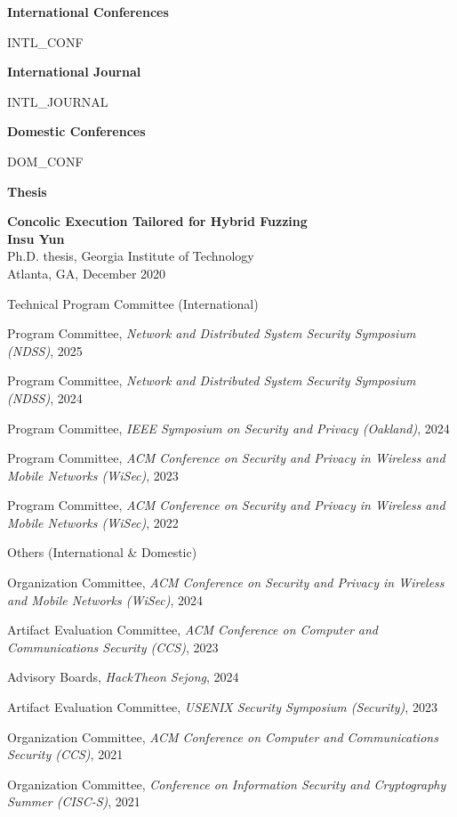 \documentclass[11pt,letterpaper]{article}
\begin{document}
%
%


\textbf{International Conferences }
\begin{etaremune}
  {{ INTL_CONF }}
\end{etaremune}

\textbf{International Journal}
\begin{etaremune}
  {{ INTL_JOURNAL }}
\end{etaremune}

\textbf{Domestic Conferences}
\begin{etaremune}
  {{ DOM_CONF }}
\end{etaremune}

\textbf{Thesis}
\begin{etaremune}
\item \textbf{Concolic Execution Tailored for Hybrid Fuzzing}  \\
{\footnotesize
  \textbf{Insu Yun} \\
  Ph.D. thesis, Georgia Institute of Technology \\
Atlanta, GA, December 2020
}
\end{etaremune}

\begin{topic}{Technical Program Committee (International)}{}
  \item{Program Committee, \emph{Network and Distributed System Security Symposium (NDSS)}, 2025} %
  \item{Program Committee, \emph{Network and Distributed System Security Symposium (NDSS)}, 2024} %
  \item{Program Committee, \emph{IEEE Symposium on Security and Privacy (Oakland)}, 2024} %
  \item{Program Committee, \emph{ACM Conference on Security and Privacy in Wireless and Mobile Networks (WiSec)}, 2023}
  \item{Program Committee, \emph{ACM Conference on Security and Privacy in Wireless and Mobile Networks (WiSec)}, 2022}
\end{topic}

\begin{topic}{Others (International \& Domestic)}{}
  \item{Organization Committee, \emph{ACM Conference on Security and Privacy in Wireless and Mobile Networks (WiSec)}, 2024} %
  \item{Artifact Evaluation Committee, \emph{ACM Conference on Computer and Communications Security (CCS)}, 2023}
  \item{Advisory Boards, \emph{HackTheon Sejong}, 2024}
  \item{Artifact Evaluation Committee, \emph{USENIX Security Symposium (Security)}, 2023}
  \item{Organization Committee, \emph{ACM Conference on Computer and Communications Security (CCS)}, 2021}
  \item{Organization Committee, \emph{Conference on Information Security and Cryptography Summer (CISC-S)}, 2021}
\end{topic}
\end{document}
